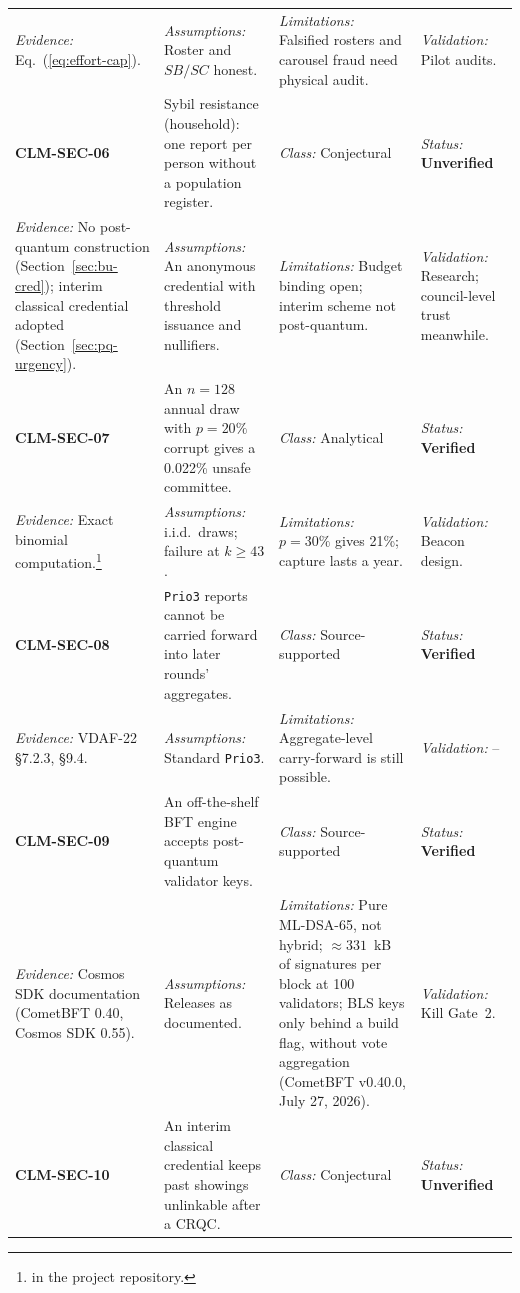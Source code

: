 \documentclass[10pt,twoside,openany]{book}
\theoremstyle{dpepstyle}
\begin{document}
{\begin{longtable}{L{0.92in} L{1.42in} L{1.07in} L{1.12in}}
\emph{Evidence:} Eq.~(\ref{eq:effort-cap}). & \emph{Assumptions:} Roster and $SB/SC$ honest. & \emph{Limitations:} Falsified rosters and carousel fraud need physical audit. & \emph{Validation:} Pilot audits. \\
\addlinespace[1pt]\midrule
\textbf{CLM-SEC-06} & Sybil resistance (household): one report per person without a population register. & \emph{Class:} Conjectural & \emph{Status:} \textbf{Unverified} \\*
\emph{Evidence:} No post-quantum construction (Section~\ref{sec:bu-cred}); interim classical credential adopted (Section~\ref{sec:pq-urgency}). & \emph{Assumptions:} An anonymous credential with threshold issuance and nullifiers. & \emph{Limitations:} Budget binding open; interim scheme not post-quantum. & \emph{Validation:} Research; council-level trust meanwhile. \\
\addlinespace[1pt]\midrule
\textbf{CLM-SEC-07} & An $n=128$ annual draw with $p=20\%$ corrupt gives a 0.022\% unsafe committee. & \emph{Class:} Analytical & \emph{Status:} \textbf{Verified} \\*
\emph{Evidence:} Exact binomial computation.\footnote{ in the project repository.} & \emph{Assumptions:} i.i.d.\ draws; failure at $k\ge 43$. & \emph{Limitations:} $p=30\%$ gives 21\%; capture lasts a year. & \emph{Validation:} Beacon design. \\
\addlinespace[1pt]\midrule
\textbf{CLM-SEC-08} & \texttt{Prio3} reports cannot be carried forward into later rounds' aggregates. & \emph{Class:} Source-supported & \emph{Status:} \textbf{Verified} \\*
\emph{Evidence:} VDAF-22 \S 7.2.3, \S 9.4. & \emph{Assumptions:} Standard \texttt{Prio3}. & \emph{Limitations:} Aggregate-level carry-forward is still possible. & \emph{Validation:} -- \\
\addlinespace[1pt]\midrule
\textbf{CLM-SEC-09} & An off-the-shelf BFT engine accepts post-quantum validator keys. & \emph{Class:} Source-supported & \emph{Status:} \textbf{Verified} \\*
\emph{Evidence:} Cosmos SDK documentation (CometBFT 0.40, Cosmos SDK 0.55). & \emph{Assumptions:} Releases as documented. & \emph{Limitations:} Pure ML-DSA-65, not hybrid; $\approx 331$~kB of signatures per block at 100 validators; BLS keys only behind a build flag, without vote aggregation (CometBFT v0.40.0, July 27, 2026). & \emph{Validation:} Kill Gate~2. \\
\addlinespace[1pt]\midrule
\textbf{CLM-SEC-10} & An interim classical credential keeps past showings unlinkable after a CRQC. & \emph{Class:} Conjectural & \emph{Status:} \textbf{Unverified} \\*

\end{longtable}}
\end{document}
